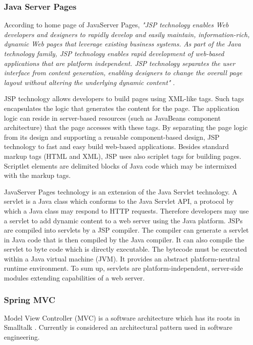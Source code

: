 \subsubsection{Java Server Pages}
\label{sss:jsp}

According to home page of JavaServer Pages, \textit{"JSP technology enables Web developers and designers to rapidly develop and easily maintain, information-rich, dynamic Web pages that leverage existing business systems. As part of the Java technology family, JSP technology enables rapid development of web-based applications that are platform independent. JSP technology separates the user interface from content generation, enabling designers to change the overall page layout without altering the underlying dynamic content"} \cite{JSPHome}.

JSP technology allows developers to build pages using XML-like tags. Such tags encapsulates the logic that generates the content for the page. The application logic can reside in server-based resources (such as JavaBeans component architecture) that the page accesses with these tags. By separating the page logic from its design and supporting a reusable component-based design, JSP technology to fast and easy build web-based applications. Besides standard markup tags (HTML and XML), JSP uses also scriplet tags for building pages. Scriptlet elements are delimited blocks of Java code which may be intermixed with the markup tags.

JavaServer Pages technology is an extension of the Java Servlet technology. A servlet is a Java class which conforms to the Java Servlet API, a protocol by which a Java class may respond to HTTP requests. Therefore developers may use a servlet to add dynamic content to a web server using the Java platform. JSPs are compiled into servlets by a JSP compiler. The compiler can generate a servlet in Java code that is then compiled by the Java compiler. It can also compile the servlet to byte code which is directly executable. The bytecode must be executed within a Java virtual machine (JVM). It provides an abstract platform-neutral runtime environment. To sum up, servlets are platform-independent, server-side modules extending capabilities of a web server. 

\subsubsection{Spring MVC}
\label{sss:springMVC}

Model View Controller (MVC) is a software architecture which has its roots in Smalltalk \cite{Ree78}. Currently is considered an architectural pattern used in software engineering. 


